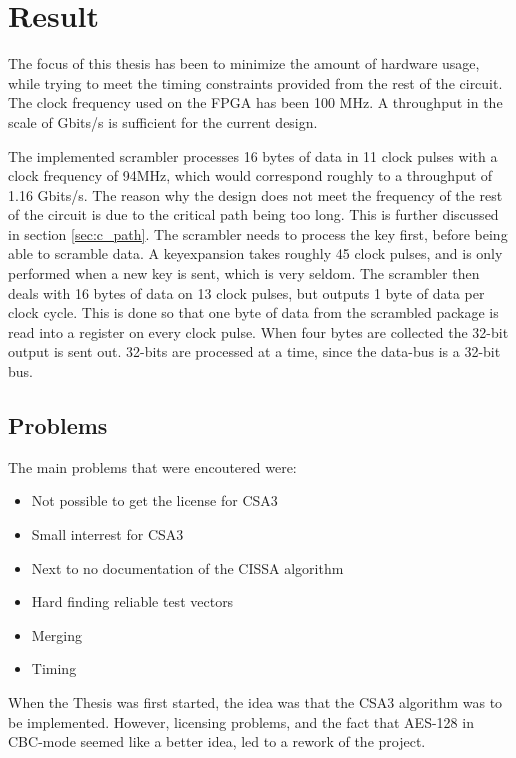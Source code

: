 \chapter{Result}
The focus of this thesis has been to minimize the amount of hardware 
usage, while trying to meet the timing constraints provided 
from the rest of the circuit. The clock frequency used on the FPGA has 
been 100 MHz. A throughput in the scale of Gbits/s is sufficient for the
current design.

The implemented scrambler processes 16 bytes of data in 11 clock pulses 
with a clock frequency of 94MHz, which would correspond 
roughly to a throughput of 1.16 Gbits/s. The reason why the design does 
not meet the frequency of the rest of the circuit is due to the 
critical path being too long. This is further discussed in section 
\ref{sec:c_path}.
The scrambler needs to process the key first, before being able to 
scramble data. A keyexpansion takes roughly 45 clock pulses, and is 
only performed when a new key is sent, which is very seldom. The 
scrambler then deals with 16 bytes of data on 13 clock pulses, but 
outputs 1 byte of data per clock cycle. This is done so that one byte 
of data from the scrambled package is read into a register on every 
clock pulse. When four bytes are collected the 32-bit output is sent 
out. 32-bits are processed at a time, since the data-bus is a 32-bit 
bus.

\section{Problems}
The main problems that were encoutered were:

\begin{itemize}
\item Not possible to get the license for CSA3
\item Small interrest for CSA3
\item Next to no documentation of the CISSA algorithm
\item Hard finding reliable test vectors
\item Merging
\item Timing
\end{itemize}

When the Thesis was first started, the idea was that the CSA3 algorithm 
was to be implemented. However, licensing problems, and the fact that 
AES-128 in CBC-mode seemed like a better idea, led to a rework of the 
project.

